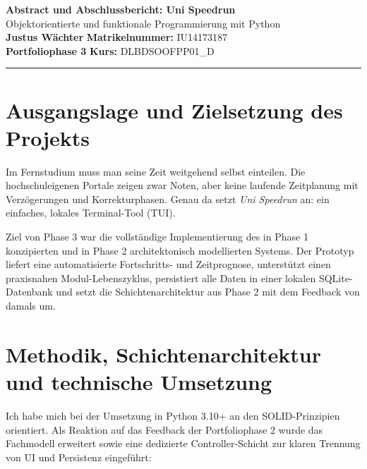 \documentclass[11pt,a4paper]{article}
\begin{document}
\noindent
{\LARGE\textbf{Abstract und Abschlussbericht: Uni Speedrun}}\\[0.2cm]
{\large Objektorientierte und funktionale Programmierung mit Python}\\[0.3cm]
\textbf{Justus Wächter} \hfill \textbf{Matrikelnummer:} IU14173187\\
\textbf{Portfoliophase 3} \hfill \textbf{Kurs:} DLBDSOOFPP01\_D
\vspace{0.3cm}
\hrule
\vspace{0.4cm}

\section{Ausgangslage und Zielsetzung des Projekts}
Im Fernstudium muss man seine Zeit weitgehend selbst einteilen. Die hochschuleigenen Portale zeigen zwar Noten, aber keine laufende Zeitplanung mit Verzögerungen und Korrekturphasen. Genau da setzt \textit{Uni Speedrun} an: ein einfaches, lokales Terminal-Tool (TUI).

Ziel von Phase 3 war die vollständige Implementierung des in Phase 1 konzipierten und in Phase 2 architektonisch modellierten Systems. Der Prototyp liefert eine automatisierte Fortschritts- und Zeitprognose, unterstützt einen praxisnahen Modul-Lebenszyklus, persistiert alle Daten in einer lokalen SQLite-Datenbank und setzt die Schichtenarchitektur aus Phase 2 mit dem Feedback von damals um.

\section{Methodik, Schichtenarchitektur und technische Umsetzung}
Ich habe mich bei der Umsetzung in Python 3.10+ an den SOLID-Prinzipien orientiert. Als Reaktion auf das Feedback der Portfoliophase 2 wurde das Fachmodell erweitert sowie eine dedizierte Controller-Schicht zur klaren Trennung von UI und Persistenz eingeführt:
\end{document}
